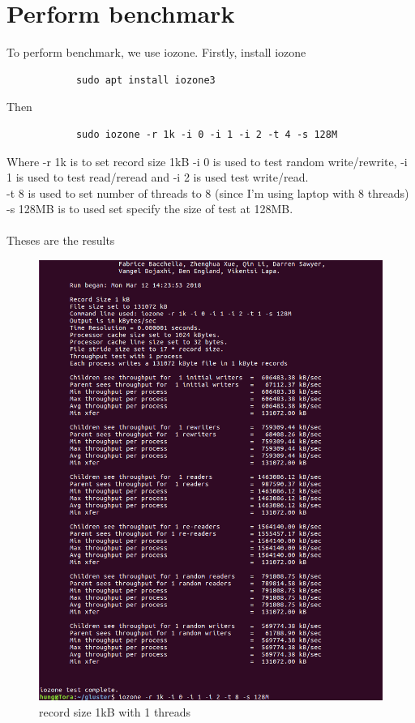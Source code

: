 \documentclass[12pt]{article}
\begin{document}
    \section{Perform benchmark}
    To perform benchmark, we use iozone. Firstly, install iozone
        \begin{verbatim}
            sudo apt install iozone3
        \end{verbatim}
        Then
        \begin{verbatim}
            sudo iozone -r 1k -i 0 -i 1 -i 2 -t 4 -s 128M
        \end{verbatim}
        Where -r 1k is to set record size 1kB
        -i 0 is used to test random write/rewrite, -i 1 is used  to test read/reread and -i 2 is used test write/read.\\
        -t 8 is used to set number of threads to 8 (since I'm using laptop with 8 threads)\\
        -s 128MB is to used set specify the size of test at 128MB.\\
        \\
        Theses are the results
    \begin{figure}[H]
        \centering
       \includegraphics[scale=0.4]{1kB 1 proccesses.png}
       \caption{record size 1kB with 1 threads}
    \end{figure}
\end{document}
